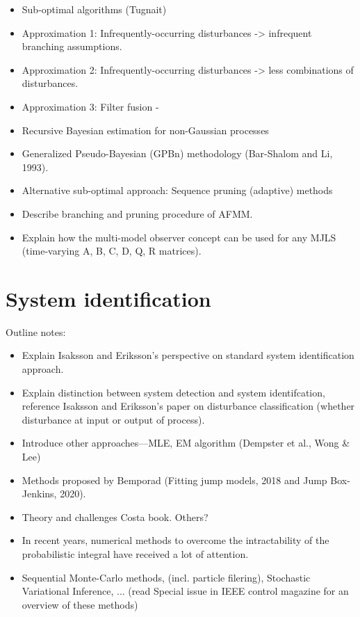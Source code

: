 \begin{itemize}
	\item Sub-optimal algorithms (Tugnait)
	\item Approximation 1: Infrequently-occurring disturbances -> infrequent branching assumptions.
	\item Approximation 2: Infrequently-occurring disturbances -> less combinations of disturbances.
	\item Approximation 3: Filter fusion - 
	\item Recursive Bayesian estimation for non-Gaussian processes
	\item Generalized Pseudo-Bayesian (GPBn) methodology (Bar-Shalom and Li, 1993).
	\item Alternative sub-optimal approach: Sequence pruning (adaptive) methods 
	\item Describe branching and pruning procedure of AFMM.
	\item Explain how the multi-model observer concept can be used for any MJLS (time-varying A, B, C, D, Q, R matrices).
\end{itemize}

\section{System identification}

Outline notes:
\begin{itemize}
	\item Explain Isaksson and Eriksson's perspective on standard system identification approach.
	\item Explain distinction between system detection and system identifcation, reference Isaksson and Eriksson's paper on disturbance classification (whether disturbance at input or output of process).
	\item Introduce other approaches—MLE, EM algorithm (Dempster et al., Wong \& Lee)
	\item Methods proposed by Bemporad (Fitting jump models, 2018 and Jump Box-Jenkins, 2020).
	\item Theory and challenges Costa book. Others?
	\item In recent years, numerical methods to overcome the intractability of the probabilistic integral have received a lot of attention.
	\item Sequential Monte-Carlo methods, (incl. particle filering), Stochastic Variational Inference, ... (read Special issue in IEEE control magazine for an overview of these methods)
\end{itemize}


